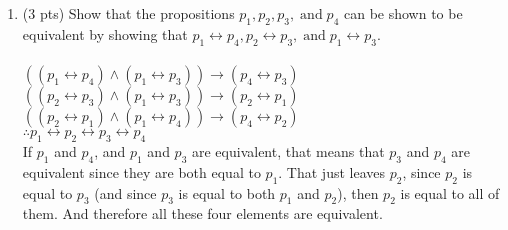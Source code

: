 \documentclass[12pt]{article}
\begin{document}
\begin{enumerate}
\item (3 pts) Show that the propositions $p_1, p_2, p_3, \; \textrm{and}\; p_4$ can be shown
to be equivalent by showing that $p_1 \leftrightarrow p_4, p_2 \leftrightarrow p_3, \; \textrm{and} \;
p_1 \leftrightarrow p_3.$\\
\\$((p_1 \leftrightarrow p_4) \land (p_1 \leftrightarrow p_3)) \rightarrow (p_4 \leftrightarrow p_3)$
\\$((p_2 \leftrightarrow p_3)\land (p_1 \leftrightarrow p_3)) \rightarrow (p_2 \leftrightarrow p_1)$
\\$((p_2 \leftrightarrow p_1) \land (p_1 \leftrightarrow p_4)) \rightarrow (p_4 \leftrightarrow p_2)$
\\$\therefore p_1 \leftrightarrow p_2 \leftrightarrow p_3 \leftrightarrow p_4$
\\If $p_1$ and $p_4$, and $p_1$ and $p_3$ are equivalent, that means that $p_3$ and $p_4$ are equivalent since they are both equal to $p_1$. That just leaves $p_2$, since $p_2$ is equal to $p_3$ (and since $p_3$ is equal to both $p_1$ and $p_2$), then $p_2$ is equal to all of them. And therefore all these four elements are equivalent.

\end{enumerate}
\end{document}
